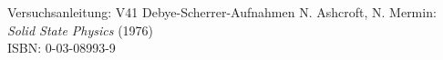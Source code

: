 \begin{thebibliography}{xxx}
 Versuchsanleitung: V41 Debye-Scherrer-Aufnahmen
 N. Ashcroft, N. Mermin: \textit{Solid State Physics} (1976) \\ ISBN: 0-03-08993-9
\end{thebibliography}








